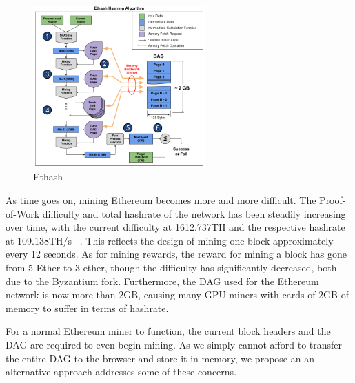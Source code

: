 \documentclass[10pt, conference, compsocconf]{IEEEtran}
\begin{document}
\begin{figure}[H]
\centering
\includegraphics[width=250px,keepaspectratio]{ethash_algorithm.png}
\caption{\label{fig:ethash} Ethash}
\end{figure}

As time goes on, mining Ethereum becomes more and more difficult. The Proof-of-Work difficulty and total hashrate of the network has been steadily increasing over time, with the current difficulty at 1612.737TH and the respective hashrate at 109.138TH/s ~\cite{etherscan}. This reflects the design of mining one block approximately every 12 seconds. As for mining rewards, the reward for mining a block has gone from 5 Ether to 3 ether, though the difficulty has significantly decreased, both due to the Byzantium fork. Furthermore, the DAG used for the Ethereum network is now more than 2GB, causing many GPU miners with cards of 2GB of memory to suffer in terms of hashrate.

For a normal Ethereum miner to function, the current block headers and the DAG are required to even begin mining. As we simply cannot afford to transfer the entire DAG to the browser and store it in memory, we propose an an alternative approach addresses some of these concerns.
\end{document}
